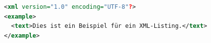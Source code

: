 \begin{lstlisting}[language=XML,caption=Beschriftung,label=lst:beispiel-1]
<xml version="1.0" encoding="UTF-8"?>
<example>
  <text>Dies ist ein Beispiel für ein XML-Listing.</text>
</example>
\end{lstlisting}